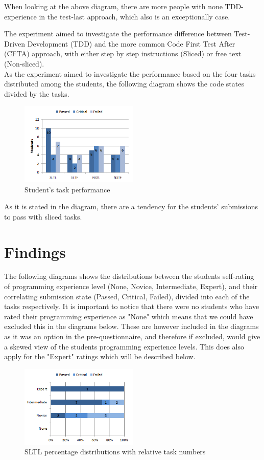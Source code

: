 \documentclass{sig-alternate-05-2015}
\begin{document}
When looking at the above diagram, there are more people with none TDD-experience in the test-last approach, which also is an exceptionally case.

The experiment aimed to investigate the performance difference between Test-Driven Development (TDD) and the more common Code First Test After (CFTA) approach, with either step by step instructions (Sliced) or free text (Non-sliced).\\

As the experiment aimed to investigate the performance based on the four tasks distributed among the students, the following diagram shows the code states divided by the tasks.

\begin{figure}[H]
	\centering
	\includegraphics[width=0.5\textwidth]{img05}
	\caption{Student's task performance}
\end{figure}

As it is stated in the diagram, there are a tendency for the students' submissions to pass with sliced tasks.

\section{Findings}

The following diagrams shows the distributions between the students self-rating of programming experience level (None, Novice, Intermediate, Expert), and their correlating submission state (Passed, Critical, Failed), divided into each of the tasks respectively.
It is important to notice that there were no students who have rated their programming experience  as "None" which means that we could have excluded this in the diagrams below. These are however included in the diagrams as it was an option in the pre-questionnaire, and therefore if excluded, would give a skewed view of the students programming experience levels. This does also apply for the "Expert" ratings which will be described below.

\begin{figure}[H]
	\centering
	\includegraphics[width=0.5\textwidth]{img06}
	\caption{SLTL percentage distributions with relative task numbers}
\end{figure}
\end{document}
